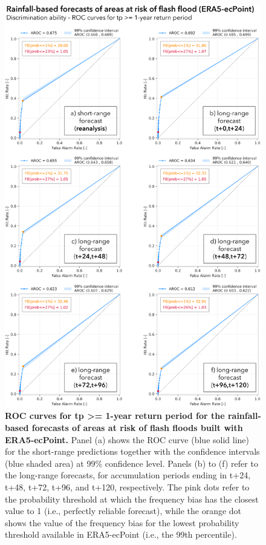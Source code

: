 \begin{figure}[htbp]
\centering
\includegraphics[width=\textwidth]{chapter_05/figures/rainfall_based_ff_roc_1rp.png}
\caption{\textbf{ROC curves for tp >= 1-year return period for the rainfall-based forecasts of areas at risk of flash floods built with ERA5-ecPoint.} Panel (a) shows the ROC curve (blue solid line) for the short-range predictions together with the confidence intervals (blue shaded area) at 99\% confidence level. Panels (b) to (f) refer to the long-range forecasts, for accumulation periods ending in t+24, t+48, t+72, t+96, and t+120, respectively. The pink dots refer to the probability threshold at which the frequency bias has the closest value to 1 (i.e., perfectly reliable forecast), while the orange dot shows the value of the frequency bias for the lowest probability threshold available in ERA5-ecPoint (i.e., the 99th percentile).}
\label{fig:rainfall_based_ff_roc_1rp}
\end{figure}

